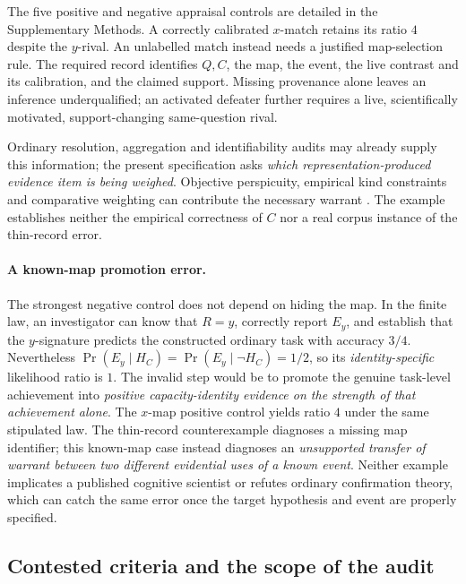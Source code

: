 \documentclass[11pt]{article}
\begin{document}
The five positive and negative appraisal controls are detailed in the Supplementary Methods. A correctly calibrated \(x\)-match retains its ratio \(4\) despite the \(y\)-rival. An unlabelled match instead needs a justified map-selection rule. The required record identifies \(Q,C\), the map, the event, the live contrast and its calibration, and the claimed support. Missing provenance alone leaves an inference underqualified; an activated defeater further requires a live, scientifically motivated, support-changing same-question rival.

Ordinary resolution, aggregation and identifiability audits may already supply this information; the present specification asks \emph{which representation-produced evidence item is being weighed}. Objective perspicuity, empirical kind constraints and comparative weighting can contribute the necessary warrant \citep{North2026Perspicuous,Beni2026KindsWithoutStructure,Brousalis2026TheoryComparison}. The example establishes neither the empirical correctness of \(C\) nor a real corpus instance of the thin-record error.


\paragraph{A known-map promotion error.}
The strongest negative control does not depend on hiding the map. In the finite law, an investigator can know that \(R=y\), correctly report \(E_y\), and establish that the \(y\)-signature predicts the constructed ordinary task with accuracy \(3/4\). Nevertheless \(\Pr(E_y\mid H_C)=\Pr(E_y\mid\neg H_C)=1/2\), so its \emph{identity-specific} likelihood ratio is \(1\). The invalid step would be to promote the genuine task-level achievement into \emph{positive capacity-identity evidence on the strength of that achievement alone}. The \(x\)-map positive control yields ratio \(4\) under the same stipulated law. The thin-record counterexample diagnoses a missing map identifier; this known-map case instead diagnoses an \emph{unsupported transfer of warrant between two different evidential uses of a known event}. Neither example implicates a published cognitive scientist or refutes ordinary confirmation theory, which can catch the same error once the target hypothesis and event are properly specified.

\subsection{Contested criteria and the scope of the audit}
\end{document}
